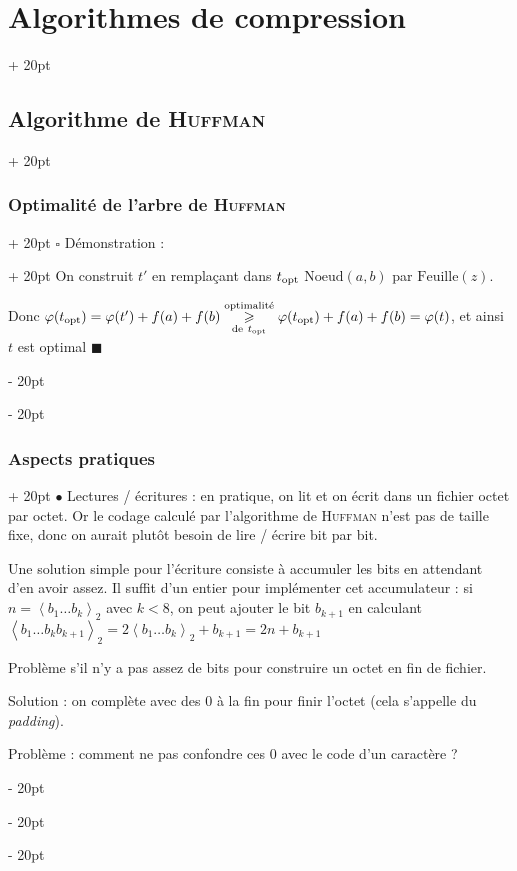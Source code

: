 \documentclass[a4paper, 12pt, twoside]{article}
\newcommand{\lrangle}[1]{\left\langle #1 \right\rangle}
\renewcommand{\ge}{\geqslant}
\newcommand{\ind}[1][20pt]{\advance\leftskip + #1}
\newcommand{\deind}[1][20pt]{\advance\leftskip - #1}
\newenvironment{indt}[2][20pt]{#2 \par \ind[#1]}{\par \deind} %
\begin{document}
\begin{indt}{\section{Algorithmes de compression}}
\begin{indt}{\subsection{Algorithme de \textsc{Huffman}}}
\begin{indt}{\subsubsection{Optimalité de l'arbre de \textsc{Huffman}}}
\begin{indt}{$\square$ Démonstration :}
                    On construit $t'$ en remplaçant dans $t_{\rm opt}$ $\mathrm{Noeud}(a, b)$ par $\mathrm{Feuille}(z)$.

                    Donc
                    $
                        \varphi(t_{\rm opt})
                        =
                        \varphi(t') + f(a) + f(b)
                        \underset{\text{de}\ t_{\rm opt}}{\overset{\text{optimalité}}{\ge}
}
                        \varphi(t_{\rm opt}) + f(a) + f(b)
                        =
                        \varphi(t)
                    $, et ainsi $t$ est optimal $\blacksquare$
                \end{indt}
            \end{indt}

            \vspace{12pt}
            
            \begin{indt}{\subsubsection{Aspects pratiques}}
                $\bullet$ Lectures / écritures : en pratique, on lit et on écrit dans un fichier octet par octet.
                Or le codage calculé par l'algorithme de \textsc{Huffman} n'est pas de taille fixe, donc on aurait plutôt besoin de lire / écrire bit par bit.

                Une solution simple pour l'écriture consiste à accumuler les bits en attendant d'en avoir assez.
                Il suffit d'un entier pour implémenter cet accumulateur :
                si $n = \lrangle{b_1 \ldots b_k}_2$ avec $k < 8$, on peut ajouter le bit $b_{k + 1}$ en calculant
                $
                    \lrangle{b_1 \ldots b_k b_{k + 1}}_2
                    = 2\lrangle{b_1 \ldots b_k}_2
                    + b_{k + 1}
                    = 2n + b_{k + 1}
                $

                \vspace{6pt}
                
                Problème s'il n'y a pas assez de bits pour construire un octet en fin de fichier.

                Solution : on complète avec des $0$ à la fin pour finir l'octet (cela s'appelle du \textit{padding}).

                \vspace{6pt}
                
                Problème : comment ne pas confondre ces $0$ avec le code d'un caractère ?


\end{indt}
\end{indt}
\end{indt}
\end{document}
